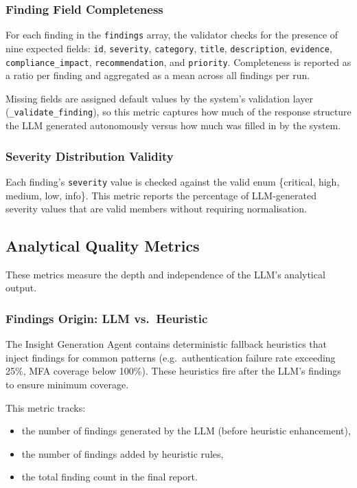 \documentclass[]{UCD_CS_FYP_Report}
\begin{document}
\subsubsection{Finding Field Completeness}

For each finding in the \texttt{findings} array, the validator checks for the presence of nine expected fields: \texttt{id}, \texttt{severity}, \texttt{category}, \texttt{title}, \texttt{description}, \texttt{evidence}, \texttt{compliance\_impact}, \texttt{recommendation}, and \texttt{priority}. Completeness is reported as a ratio per finding and aggregated as a mean across all findings per run.

Missing fields are assigned default values by the system's validation layer (\texttt{\_validate\_finding}), so this metric captures how much of the response structure the LLM generated autonomously versus how much was filled in by the system.

\subsubsection{Severity Distribution Validity}

Each finding's \texttt{severity} value is checked against the valid enum \{critical, high, medium, low, info\}. This metric reports the percentage of LLM-generated severity values that are valid members without requiring normalisation.

\subsection{Analytical Quality Metrics}

These metrics measure the depth and independence of the LLM's analytical output.

\subsubsection{Findings Origin: LLM vs.\ Heuristic}

The Insight Generation Agent contains deterministic fallback heuristics that inject findings for common patterns (e.g.\ authentication failure rate exceeding 25\%, MFA coverage below 100\%). These heuristics fire after the LLM's findings to ensure minimum coverage.

This metric tracks:
\begin{itemize}
    \item the number of findings generated by the LLM (before heuristic enhancement),
    \item the number of findings added by heuristic rules,
    \item the total finding count in the final report.
\end{itemize}
\end{document}
